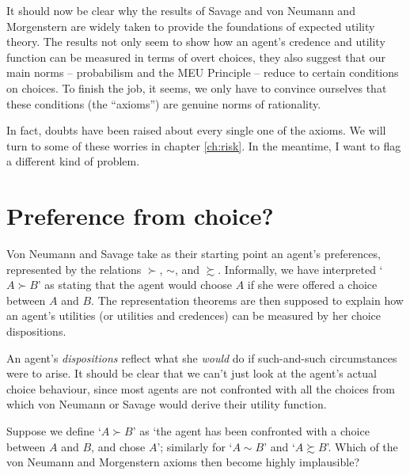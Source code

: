 
It should now be clear why the results of Savage and von Neumann and
Morgenstern are widely taken to provide the foundations of expected
utility theory. The results not only seem to show how an agent's
credence and utility function can be measured in terms of overt
choices, they also suggest that our main norms -- probabilism and the
MEU Principle -- reduce to certain conditions on choices. To finish
the job, it seems, we only have to convince ourselves that these
conditions (the ``axioms'') are genuine norms of rationality.

In fact, doubts have been raised about every single one of the axioms.
We will turn to some of these worries in chapter \ref{ch:risk}. In the
meantime, I want to flag a different kind of problem.

\section{Preference from choice?}\label{sec:preferences-choices}

Von Neumann and Savage take as their starting point an agent's
preferences, represented by the relations $\succ$, $\sim$, and
$\succsim$. Informally, we have interpreted `$A \succ B$' as stating
that the agent would choose $A$ if she were offered a choice between
$A$ and $B$. The representation theorems are then supposed to explain
how an agent's utilities (or utilities and credences) can be measured
by her choice dispositions.

An agent's \emph{dispositions} reflect what she \emph{would} do if
such-and-such circumstances were to arise. It should be clear that we
can't just look at the agent's actual choice behaviour, since most
agents are not confronted with all the choices from which von Neumann
or Savage would derive their utility function.

\begin{exercise2}
  Suppose we define `$A \succ B$' as `the agent has been confronted
  with a choice between $A$ and $B$, and chose $A$'; similarly for
  `$A\sim B$' and `$A \succsim B$'. Which of the von Neumann and
  Morgenstern axioms then become highly implausible?
\end{exercise2}

